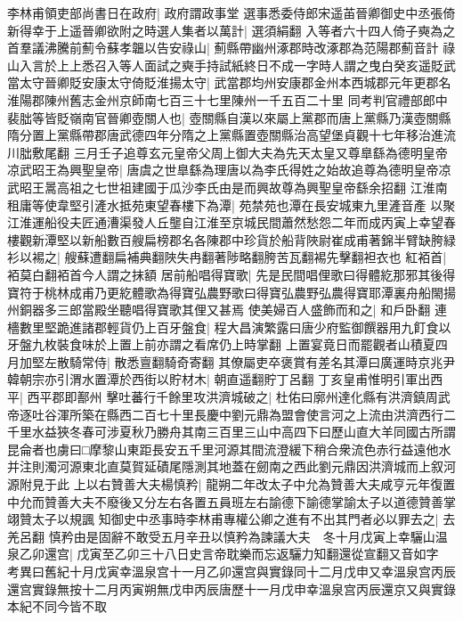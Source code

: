 李林甫領吏部尚書日在政府|{
	政府謂政事堂}
選事悉委侍郎宋遥苖晉卿御史中丞張倚新得幸于上遥晉卿欲附之時選人集者以萬計|{
	選須絹翻}
入等者六十四人倚子奭為之首羣議沸騰前薊令蘇孝韞以告安祿山|{
	薊縣帶幽州涿郡時改涿郡為范陽郡薊音計}
祿山入言於上上悉召入等人面試之奭手持試紙終日不成一字時人謂之曳白癸亥遥貶武當太守晉卿貶安康太守倚貶淮揚太守|{
	武當郡均州安康郡金州本西城郡元年更郡名淮陽郡陳州舊志金州京師南七百三十七里陳州一千五百二十里}
同考判官禮部郎中裴朏等皆貶嶺南官晉卿壺關人也|{
	壺關縣自漢以來屬上黨郡而唐上黨縣乃漢壺關縣隋分置上黨縣帶郡唐武德四年分隋之上黨縣置壺關縣治高望堡貞觀十七年移治進流川朏敷尾翻}
三月壬子追尊玄元皇帝父周上御大夫為先天太皇又尊臯繇為德明皇帝凉武昭王為興聖皇帝|{
	唐虞之世臯繇為理唐以為李氏得姓之始故追尊為德明皇帝凉武昭王暠高祖之七世祖建國于瓜沙李氏由是而興故尊為興聖皇帝繇余招翻}
江淮南租庸等使韋堅引滻水抵苑東望春樓下為潭|{
	苑禁苑也潭在長安城東九里滻音產}
以聚江淮運船役夫匠通漕渠發人丘壟自江淮至京城民間蕭然愁怨二年而成丙寅上幸望春樓觀新潭堅以新船數百艘扁榜郡名各陳郡中珍貨於船背陜尉崔成甫著錦半臂缺胯緑衫以裼之|{
	艘蘇遭翻扁補典翻陜失冉翻著陟略翻胯苦瓦翻裼先擊翻袒衣也}
紅袹首|{
	袹莫白翻袹首今人謂之抹額}
居前船唱得寶歌|{
	先是民間唱俚歌曰得體紇那邪其後得寶符于桃林成甫乃更紇體歌為得寶弘農野歌曰得寶弘農野弘農得寶耶潭裏舟船閙揚州銅器多三郎當殿坐聽唱得寶歌其俚又甚焉}
使美婦百人盛飾而和之|{
	和戶卧翻}
連檣數里堅跪進諸郡輕貨仍上百牙盤食|{
	程大昌演繁露曰唐少府監御饌器用九飣食以牙盤九枚裝食味於上置上前亦謂之看席仍上時掌翻}
上置宴竟日而罷觀者山積夏四月加堅左散騎常侍|{
	散悉亶翻騎奇寄翻}
其僚屬吏卒褒賞有差名其潭曰廣運時京兆尹韓朝宗亦引渭水置潭於西街以貯材木|{
	朝直遥翻貯丁呂翻}
丁亥皇甫惟明引軍出西平|{
	西平郡即鄯州}
擊吐蕃行千餘里攻洪濟城破之|{
	杜佑曰廓州達化縣有洪濟鎮周武帝逐吐谷渾所築在縣西二百七十里長慶中劉元鼎為盟會使言河之上流由洪濟西行二千里水益狹冬春可涉夏秋乃勝舟其南三百里三山中高四下曰歷山直大羊同國古所謂昆侖者也虜曰□摩黎山東距長安五千里河源其間流澄緩下稍合衆流色赤行益遠他水并注則濁河源東北直莫賀延磧尾隱測其地蓋在劒南之西此劉元鼎因洪濟城而上叙河源附見于此}
上以右贊善大夫楊慎矜|{
	龍朔二年改太子中允為贊善大夫咸亨元年復置中允而贊善大夫不廢後又分左右各置五員班左右諭德下諭德掌諭太子以道德贊善掌翊贊太子以規諷}
知御史中丞事時李林甫專權公卿之進有不出其門者必以罪去之|{
	去羌呂翻}
慎矜由是固辭不敢受五月辛丑以慎矜為諫議大夫　冬十月戊寅上幸驪山温泉乙卯還宫|{
	戊寅至乙卯三十八日史言帝耽樂而忘返驪力知翻還從宣翻又音如字　考異曰舊紀十月戊寅幸溫泉宫十一月乙卯還宫與實錄同十二月戊申又幸溫泉宫丙辰還宫實錄無按十二月丙寅朔無戊申丙辰唐歷十一月戊申幸溫泉宫丙辰還京又與實錄本紀不同今皆不取}


